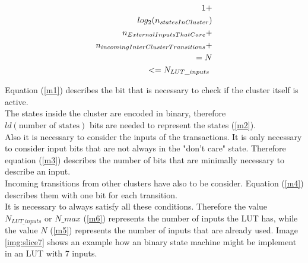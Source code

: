 \begin{center}
\begin{eqnarray}
1\vspace{1cm} \label{m1}+\\
log_2(n_{statesInCluster}) \label{m2} \\
n_{ExternalInputsThatCare} \label{m3}+ \\
n_{incomingInterClusterTransitions} \label{m4}+ \\
= N \label{m5}\\
<= N_{LUT\_inputs} \label{m6}\
\end{eqnarray}
\end{center}

Equation (\ref{m1}) describes the bit that is necessary to check if the cluster itself is active.\\
The states inside the cluster are encoded in binary, therefore $ld(\text{number of states})$ bits are needed to represent the states (\ref{m2}). \\
Also it is necessary to consider the inputs of the transactions. It is only necessary to consider input bits that are not always in the "don't care" state. Therefore equation (\ref{m3}) describes the number of bits that are minimally necessary to describe an input. \\
Incoming transitions from other clusters have also to be consider. Equation (\ref{m4}) describes them with one bit for each transition. \\

It is necessary to always satisfy all these conditions. Therefore the value $N_{LUT\_inputs}$ or $N\_max$ (\ref{m6}) represents the number of inputs the LUT has, while the value $N$ (\ref{m5}) represents the number of inputs that are already used.
Image \ref{img:slice7} shows an example how an binary state machine might be implement in an LUT with 7 inputs.


